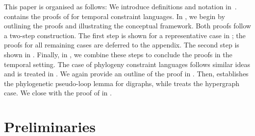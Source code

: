 \documentclass[a4paper,reqno, cleveref]{amsart}
\begin{document}
This paper is organised as follows: We introduce definitions and notation in~.
%
 contains the proofs of
 for temporal constraint languages. In , we begin by outlining the proofs and illustrating the  conceptual framework. Both proofs follow a two-step construction. The first step is shown for a representative case in ; the proofs for all remaining cases are deferred to the appendix. The second step is shown in . Finally, in , we combine these steps to conclude the proofs in the temporal setting.
%
The case of phylogeny constraint languages follows  similar ideas and is treated in . We again provide an outline of the proof in . Then,  establishes the phylogenetic pseudo-loop lemma for digraphs, while  treats the hypergraph case. We close with the proof of  in .
%
%

\section{Preliminaries}\label{sect:prelims}
\end{document}
